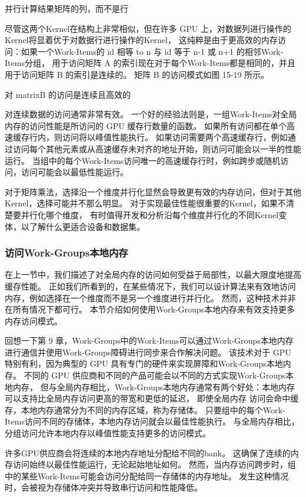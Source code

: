 {\color{red} 并行计算结果矩阵的列，而不是行}

尽管这两个Kernel在结构上非常相似，但在许多 GPU 上，对数据列进行操作的Kernel将显着优于对数据行进行操作的Kernel，
这纯粹是由于更高效的内存访问：如果一个Work-Items的 id 相等 to n 与 id 等于 n-1 或 n+1 的相邻Work-Items分组，
用于访问矩阵 A 的索引现在对于每个Work-Items都是相同的，并且用于访问矩阵 B 的索引是连续的。 
矩阵 B 的访问模式如图 15-19 所示。

{\color{red} 对 matrixB 的访问是连续且高效的}

对连续数据的访问通常非常有效。 一个好的经验法则是，一组Work-Items对全局内存的访问性能是所访问的 GPU 缓存行数量的函数。 
如果所有访问都在单个高速缓存行内，则访问将以峰值性能执行。 
如果访问需要两个高速缓存行，例如通过访问每个其他元素或从高速缓存未对齐的地址开始，则访问可能会以一半的性能运行。 
当组中的每个Work-Items访问唯一的高速缓存行时，例如跨步或随机访问，访问可能会以最低性能运行。

\begin{remark}[分析Kernel变体]
对于矩阵乘法，选择沿一个维度并行化显然会导致更有效的内存访问，但对于其他Kernel，选择可能并不那么明显。
对于实现最佳性能很重要的Kernel，如果不清楚要并行化哪个维度，
有时值得开发和分析沿每个维度并行化的不同Kernel变体，以了解什么更适合设备和数据集。
\end{remark}

\subsubsection{访问Work-Groups本地内存}
在上一节中，我们描述了对全局内存的访问如何受益于局部性，以最大限度地提高缓存性能。 
正如我们所看到的，在某些情况下，我们可以设计算法来有效地访问内存，例如选择在一个维度而不是另一个维度进行并行化。 
然而，这种技术并非在所有情况下都可行。 本节介绍如何使用Work-Groups本地内存来有效支持更多内存访问模式。

回想一下第 9 章，Work-Groups中的Work-Items可以通过Work-Groups本地内存进行通信并使用Work-Groups障碍进行同步来合作解决问题。 
该技术对于 GPU 特别有利，因为典型的 GPU 具有专门的硬件来实现屏障和Work-Groups本地内存。 
不同的 GPU 供应商和不同的产品可能会以不同的方式实现Work-Groups本地内存，
但与全局内存相比，Work-Groups本地内存通常有两个好处：本地内存可以支持比全局内存访问更高的带宽和更低的延迟，
即使全局内存 访问会命中缓存，本地内存通常分为不同的内存区域，称为存储体。 
只要组中的每个Work-Items访问不同的存储体，本地内存访问就会以最佳性能执行。 
与全局内存相比，分组访问允许本地内存以峰值性能支持更多的访问模式。

许多GPU供应商会将连续的本地内存地址分配给不同的bank。 这确保了连续的内存访问始终以最佳性能运行，无论起始地址如何。 
然而，当内存访问跨步时，组中的某些Work-Items可能会访问分配给同一存储体的内存地址。 
发生这种情况时，会被视为存储体冲突并导致串行访问和性能降低。


